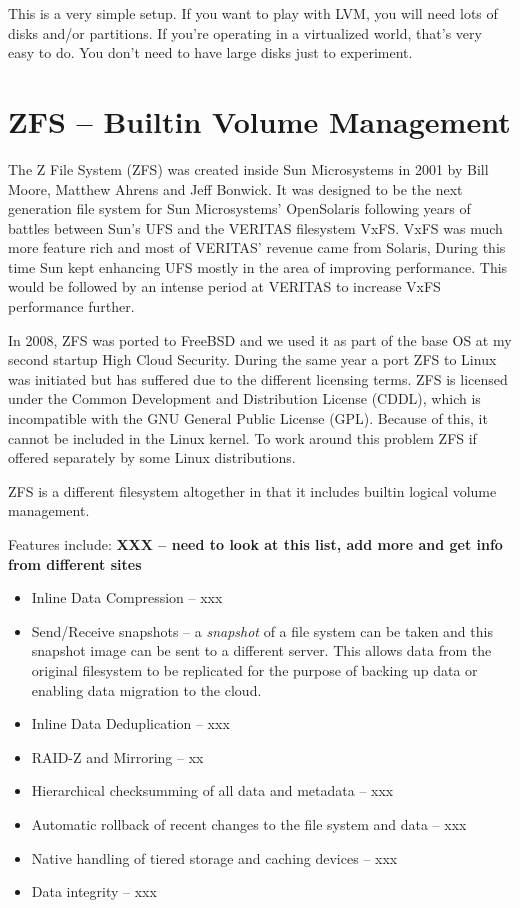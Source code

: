 \noindent
This is a very simple setup. If you want to play with LVM, you will need lots of disks and/or partitions. If you're operating in a virtualized world, that's very easy to do. You don't need to have large disks just to experiment.


\section{ZFS -- Builtin Volume Management}

The Z File System (ZFS) was created inside Sun Microsystems in 2001 by Bill Moore, Matthew Ahrens and Jeff Bonwick. It was designed to be the next generation file system for Sun Microsystems’ OpenSolaris following years of battles between Sun's UFS and the VERITAS filesystem VxFS. VxFS was much more feature rich and most of VERITAS' revenue came from Solaris, During this time Sun kept enhancing UFS mostly in the area of improving performance. This would be followed by an intense period at VERITAS to increase VxFS performance further.

In 2008, ZFS was ported to FreeBSD and we used it as part of the base OS at my second startup High Cloud Security. During the same year a port ZFS to Linux was initiated but has suffered due to the different licensing terms. ZFS is licensed under the Common Development and Distribution License (CDDL), which is incompatible with the GNU General Public License (GPL). Because of this, it cannot be included in the Linux kernel. To work around this problem ZFS if offered separately by some Linux distributions.

ZFS is a different filesystem altogether in that it includes builtin logical volume management.

Features include: \textbf{XXX -- need to look at this list, add more and get info from different sites}

\begin{itemize}
	\item Inline Data Compression -- xxx
	\item Send/Receive snapshots -- a \textit{snapshot} of a file system can be taken and this snapshot image can be sent 
		to a different server. This allows data from the original filesystem to be replicated for the purpose of 
		backing up data or enabling data migration to the cloud.
	\item Inline Data Deduplication -- xxx
	\item RAID-Z and Mirroring -- xx
	\item Hierarchical checksumming of all data and metadata -- xxx
	\item Automatic rollback of recent changes to the file system and data -- xxx
	\item Native handling of tiered storage and caching devices -- xxx
	\item Data integrity -- xxx
\end{itemize}

